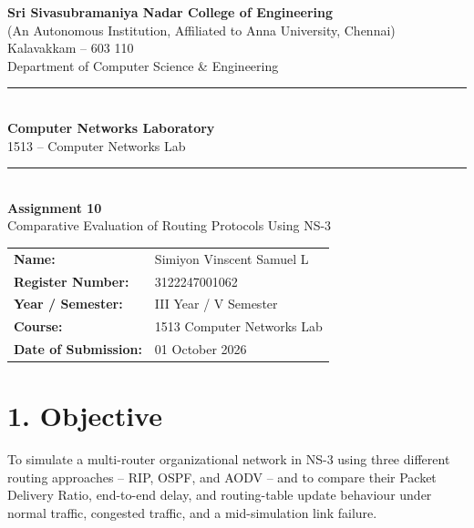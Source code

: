 \documentclass[11pt]{article}
\title{\vspace{-2cm}}
\date{}
\begin{document}
\begin{titlepage}
\centering
\vspace*{1cm}
{\large \textbf{Sri Sivasubramaniya Nadar College of Engineering}}\\
{\small (An Autonomous Institution, Affiliated to Anna University, Chennai)}\\
{\small Kalavakkam -- 603 110}\\[0.3cm]
{\small Department of Computer Science \& Engineering}\\[1.5cm]

\rule{\linewidth}{0.5mm}\\[0.4cm]
{\LARGE \textbf{Computer Networks Laboratory}}\\[0.3cm]
{\Large 1513 -- Computer Networks Lab}\\[0.4cm]
\rule{\linewidth}{0.5mm}\\[1.5cm]

{\huge \textbf{Assignment 10}}\\[0.4cm]
{\Large Comparative Evaluation of Routing Protocols Using NS-3}\\[2cm]

\begin{center}
\begin{tabular}{ll}
\textbf{Name:} & Simiyon Vinscent Samuel L \\[0.2cm]
\textbf{Register Number:} & 3122247001062 \\[0.2cm]
\textbf{Year / Semester:} & III Year / V Semester \\[0.2cm]
\textbf{Course:} & 1513 Computer Networks Lab \\[0.2cm]
\textbf{Date of Submission:} & 01 October 2026 \\[0.2cm]
\end{tabular}
\end{center}

\vfill
\end{titlepage}

\section*{1. Objective}
To simulate a multi-router organizational network in NS-3 using three
different routing approaches -- RIP, OSPF, and AODV -- and to compare their
Packet Delivery Ratio, end-to-end delay, and routing-table update behaviour
under normal traffic, congested traffic, and a mid-simulation link failure.
\end{document}
